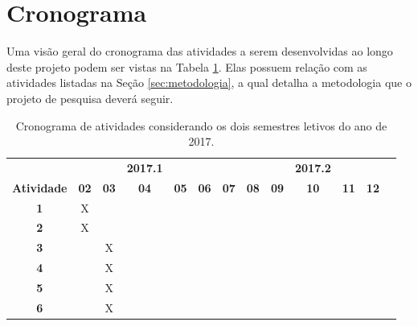 \section{Cronograma}

Uma visão geral do cronograma das atividades a serem desenvolvidas ao longo deste projeto podem ser vistas na Tabela \ref{tab:cronograma}. Elas possuem relação com as atividades listadas na Seção \ref{sec:metodologia}, a qual detalha a metodologia que o projeto de pesquisa deverá seguir.

\begin{table}[h!]
\caption{Cronograma de atividades considerando os dois semestres letivos do ano de 2017.} \label{tab:cronograma}
\begin{center}
\begin{small}
\begin{tabular}{ccccccccccccc}
  \toprule
                  &  &  & \textbf{2017.1}  &  &  &  &  & & \textbf{2017.2} &  &   \\
 \textbf{Atividade}               & \textbf{02} & \textbf{03} & \textbf{04} & \textbf{05} & \textbf{06} & \textbf{07} & \textbf{08} & \textbf{09} & \textbf{10} & \textbf{11} & \textbf{12} \\
  \midrule
  \textbf{1}     &      X      &           &            &            &            &            &            &            &             &             &                     \\
  \textbf{2}   &    X        &           &           &            &            &            &            &            &                         &               &      \\
  \textbf{3}                                                &            &       X     &            &           &            &           &            &            &             &             &                     \\
  \textbf{4}                                    &            &     X       &            &           &            &            &           &                        &           &               &      \\
  \textbf{5}                                    &            &  X          &            &            &            &            &            &                         &             &               &      \\
    \textbf{6}                                    &            &    X        &            &            &            &            &                        &             &             &               &      \\

\end{tabular}
\end{small}
\end{center}
\end{table}
